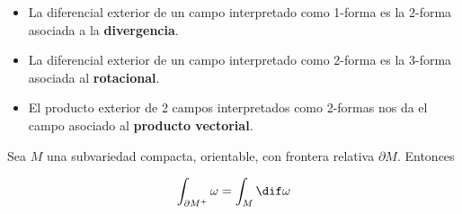 \begin{itemize}
\item La diferencial exterior de un campo interpretado como 1-forma es la 2-forma asociada a la \textbf{divergencia}.
\item La diferencial exterior de un campo interpretado como 2-forma es la 3-forma asociada al \textbf{rotacional}.
\item El producto exterior de 2 campos interpretados como 2-formas nos da el campo asociado al \textbf{producto vectorial}.
\end{itemize} 

\begin{theorem}
Sea $M$ una subvariedad compacta, orientable, con frontera relativa $\partial  M$. Entonces

\[\int_{\partial  M^+}\omega = \int_M \dif \omega \]

\end{theorem}